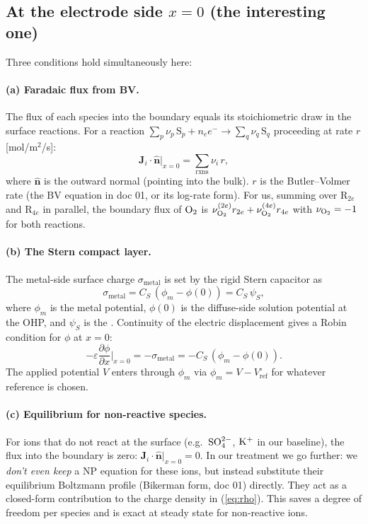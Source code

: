 \documentclass[11pt]{article}
\begin{document}
\subsection{At the electrode side $x = 0$ (the interesting one)}

Three conditions hold simultaneously here:

\paragraph{(a) Faradaic flux from BV.} The flux of each species
into the boundary equals its stoichiometric draw in the surface
reactions. For a reaction $\sum_p \nu_p \,\mathrm{S}_p + n_e e^- \to
\sum_q \nu_q \,\mathrm{S}_q$ proceeding at rate $r$
[mol/m$^2$/s]:
\begin{equation}
  \mathbf{J}_i \cdot \hat{\mathbf{n}}\big|_{x=0}
     = \sum_{\text{rxns}} \nu_i \, r,
  \label{eq:bv-flux}
\end{equation}
where $\hat{\mathbf{n}}$ is the outward normal (pointing into the
bulk). $r$ is the Butler--Volmer rate (the BV equation in doc 01,
or its log-rate form). For us, summing over R$_{2e}$
and R$_{4e}$ in parallel, the boundary flux of $\mathrm{O_2}$ is
$\nu_{\mathrm{O_2}}^{(2e)} r_{2e} + \nu_{\mathrm{O_2}}^{(4e)} r_{4e}$ with
$\nu_{\mathrm{O_2}} = -1$ for both reactions.

\paragraph{(b) The Stern compact layer.} The metal-side surface
charge $\sigma_{\mathrm{metal}}$ is set by the rigid Stern
capacitor as
\begin{equation}
  \sigma_{\mathrm{metal}} = C_S \,(\phi_m - \phi(0)) = C_S \,\psi_S,
  \label{eq:stern}
\end{equation}
where $\phi_m$ is the metal potential, $\phi(0)$ is the diffuse-side
solution potential at the OHP, and $\psi_S$ is the
. Continuity of the electric
displacement gives a Robin condition for $\phi$ at $x=0$:
\begin{equation}
  -\varepsilon \frac{\partial \phi}{\partial x}\bigg|_{x=0}
     = -\sigma_{\mathrm{metal}}
     = -C_S\,(\phi_m - \phi(0)).
  \label{eq:phi-bc}
\end{equation}
The applied potential $V$ enters through $\phi_m$ via
$\phi_m = V - V^{\circ}_{\mathrm{ref}}$ for whatever reference is
chosen.

\paragraph{(c) Equilibrium for non-reactive species.} For ions that
do not react at the surface (e.g.\ $\mathrm{SO_4^{2-}}$, $\mathrm{K^+}$ in our
baseline), the flux into the boundary is zero:
$\mathbf{J}_i\cdot \hat{\mathbf{n}}|_{x=0} = 0$. In our
 treatment we go further: we
\emph{don't even keep} a NP equation for these ions, but instead
substitute their equilibrium Boltzmann profile (Bikerman form, doc 01)
directly. They act as a closed-form contribution to the
charge density in (\ref{eq:rho}). This saves a degree of freedom per
species and is exact at steady state for non-reactive ions.
\end{document}
